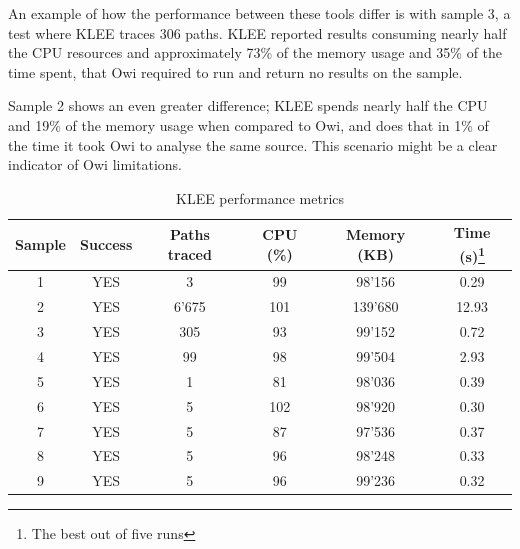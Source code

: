 An example of how the performance between these tools differ is with sample 3, a test where KLEE traces 306 paths. KLEE reported results consuming nearly half the CPU resources and approximately 73\% of the memory usage and 35\% of the time spent, that Owi required to run and return no results on the sample.

Sample 2 shows an even greater difference; KLEE spends nearly half the CPU and 19\% of the memory usage when compared to Owi, and does that in 1\% of the time it took Owi to analyse the same source. This scenario might be a clear indicator of Owi limitations.

\newpage
\begin{table}[htbp]
    \centering
    \begin{tabular}{c|c|c|c|c|c}
        Sample & Success & Paths traced & CPU (\%) & Memory (KB) & Time (s)\footnote{The best out of five runs} \\
        \hline
        \hline
        1 & YES & 3 & 99 & 98'156 & 0.29 \\
        2 & YES & 6'675 & 101 & 139'680 & 12.93 \\
        3 & YES & 305 & 93 & 99'152 & 0.72 \\
        4 & YES & 99 & 98 & 99'504 & 2.93 \\
        5 & YES & 1 & 81 & 98'036 & 0.39 \\
        6 & YES & 5 & 102 & 98'920 & 0.30 \\
        7 & YES & 5 & 87 & 97'536 & 0.37 \\
        8 & YES & 5 & 96 & 98'248 & 0.33 \\
        9 & YES & 5 & 96 & 99'236 & 0.32 \\
    \end{tabular}
    \caption{KLEE performance metrics}
    \label{tab:klee_performance}
\end{table}

